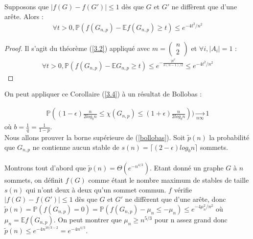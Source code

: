 

\begin{corollary}
\label{3.4}
Supposons que $|f(G)-f(G')| \leq 1$ dès que $G$ et $G'$ ne diffèrent que d'une arête.
Alors :
\begin{eqnarray*}
\forall t > 0, \mathbb{P}(f(G_{n,p})-\mathbb{E}f(G_{n,p}) \geq t) \leq e^{-4t^2/n^2} 
\end{eqnarray*} 
\end{corollary}

\begin{proof}
Il s'agit du théorème (\ref{3.2}) appliqué avec $m=\left( \begin{array}{c} n \\ 2
\end{array} \right)$ et $\forall i, |A_i|=1$ :
\begin{eqnarray*}
 \forall t > 0, \mathbb{P}(f(G_{n,p})-\mathbb{E} G_{n,p} \geq t) \leq e^{-\frac{2t^2}{n(n-1)/2}} \leq e^{-4t^2/n^2}
\end{eqnarray*}
\end{proof}

On peut appliquer ce Corollaire (\ref{3.4}) à un résultat de Bollobas :

\begin{eqnarray} 
\label{bollobas}
\mathbb{P}((1-\epsilon) \frac{n}{2 log_bn} \leq \chi(G_{n,p}) \leq (1+\epsilon)\frac{n}{2log_bn}))\xrightarrow[n \infty]{} 1
\end{eqnarray}
où $b=\frac{1}{q}=\frac{1}{1-p}$.\\

Nous allons prouver la borne supérieure de (\ref{bollobas}).
Soit $\tilde p(n)$ la probabilité que $G_{n,p}$ ne contienne aucun stable de $s(n)=\lceil {(2-\epsilon)log_bn} \rceil$ sommets.\\\\
 Montrons tout d'abord que $\tilde p(n)=\Theta(e^{-n^{4/3}})$.
Etant donné un graphe $G$ à $n$ sommets, on définit $f(G)$ comme étant le nombre maximum de stables de taille $s(n)$ qui n'ont deux à deux qu'un sommet commun.
$f$ vérifie $|f(G)-f(G')| \leq 1$ dès que $G$ et $G'$ ne diffèrent que d'une arête, donc $\tilde p(n)=\mathbb{P}(f(G_{n,p})=0)=\mathbb{P}(f(G_{n,p})-\mu_n \leq -\mu_n) \leq e^{-4 \mu_n^2/n^2} $ où $\mu_n=\mathbb{E}f(G_{n,p})$.
On peut montrer que $\mu_n \geq n^{5/3}$ pour n assez grand donc $\tilde p (n) \leq e^{-4n^{10/3-2}}=e^{-4n^{4/3}}$.\\\\




